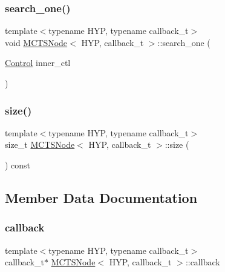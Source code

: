 \mbox{\label{class_m_c_t_s_node_ad35e1c5b66975ff4fea36fbec33e2acd}} 
\subsubsection{\texorpdfstring{search\+\_\+one()}{search\_one()}}
{\footnotesize\ttfamily template$<$typename H\+YP, typename callback\+\_\+t$>$ \\
void \hyperlink{class_m_c_t_s_node}{M\+C\+T\+S\+Node}$<$ H\+YP, callback\+\_\+t $>$\+::search\+\_\+one (\begin{DoxyParamCaption}\item[{\hyperlink{struct_control}{Control}}]{inner\+\_\+ctl }\end{DoxyParamCaption})\hspace{0.3cm}{\ttfamily [inline]}}

\mbox{\label{class_m_c_t_s_node_a9e6997465d24c26cadd556346d722959}} 
\subsubsection{\texorpdfstring{size()}{size()}}
{\footnotesize\ttfamily template$<$typename H\+YP, typename callback\+\_\+t$>$ \\
size\+\_\+t \hyperlink{class_m_c_t_s_node}{M\+C\+T\+S\+Node}$<$ H\+YP, callback\+\_\+t $>$\+::size (\begin{DoxyParamCaption}{ }\end{DoxyParamCaption}) const\hspace{0.3cm}{\ttfamily [inline]}}



\subsection{Member Data Documentation}
\mbox{\label{class_m_c_t_s_node_aa02cc56ca94e1ce0449aed1c3def8737}} 
\subsubsection{\texorpdfstring{callback}{callback}}
{\footnotesize\ttfamily template$<$typename H\+YP, typename callback\+\_\+t$>$ \\
callback\+\_\+t$\ast$ \hyperlink{class_m_c_t_s_node}{M\+C\+T\+S\+Node}$<$ H\+YP, callback\+\_\+t $>$\+::callback}

